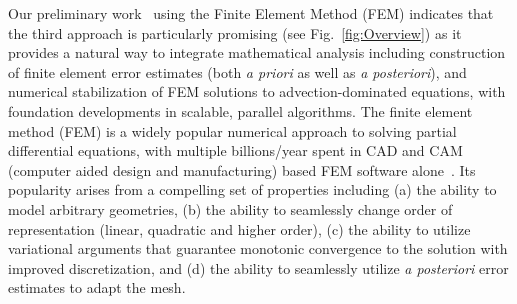 Our preliminary work~\cite{dyja2018parallel} using the Finite Element Method (FEM) indicates that the third approach is particularly promising (see Fig.~\ref{fig:Overview}) as it provides a natural way to integrate mathematical analysis including construction of finite element error estimates (both {\it a priori} as well as {\it a posteriori}), and numerical stabilization of FEM solutions to advection-dominated equations, with foundation developments in scalable, parallel algorithms. The finite element method (FEM) is a widely popular numerical approach to solving partial differential equations, with multiple billions/year spent in CAD and CAM (computer aided design and manufacturing) based FEM software alone~\cite{Hughes_iso_book}. Its popularity arises from a compelling set of properties including (a) the ability to model arbitrary geometries, (b) the ability to seamlessly change order of representation (linear, quadratic and higher order), (c) the ability to utilize variational arguments that guarantee monotonic convergence to the solution with improved discretization, and (d) the ability to seamlessly utilize {\it a posteriori} error estimates to adapt the mesh. 

